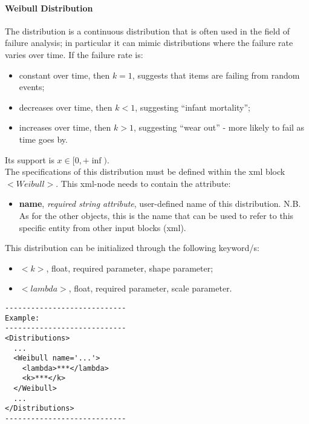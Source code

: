 \paragraph{Weibull Distribution}
\label{Weibull}
The  distribution is a continuous distribution that is often used in the field of failure analysis; in particular it can mimic distributions where the failure rate varies over time. If the failure rate is:
\vspace{-5mm}
\begin{itemize}
\itemsep0em
\item constant over time, then $k = 1$, suggests that items are failing from random events;   
\item decreases over time, then $k < 1$, suggesting ``infant mortality''; 
\item increases over time, then $k > 1$, suggesting ``wear out'' - more likely to fail as time goes by.
\end{itemize}
\vspace{-5mm}
 Its support is $x \in [0, +\inf)$.
\\ The specifications of this distribution must be defined within the xml block $<Weibull>$. This xml-node needs to contain the attribute:
\vspace{-5mm}
\begin{itemize}
\itemsep0em
\item \textbf{name}, \textit{required string attribute}, user-defined name of this distribution. N.B. As for the other objects, this is the name that can be used to refer to this specific entity from other input blocks (xml).   
\end{itemize}
\vspace{-5mm}
This distribution can be initialized through the following keyword/s:
\begin{itemize}
\item $<k>$, float, required parameter, shape parameter;
\item $<lambda>$, float, required parameter, scale parameter.
\end{itemize}

\begin{lstlisting}[style=XML]
----------------------------
Example:
----------------------------
<Distributions>
  ...
  <Weibull name='...'>
    <lambda>***</lambda>
    <k>***</k>
  </Weibull>
  ...
</Distributions>
----------------------------
\end{lstlisting}

